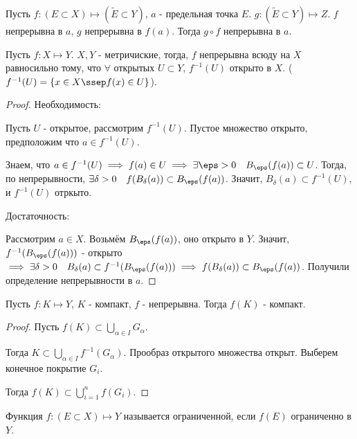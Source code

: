 \begin{theorem} \thmslashn

    Пусть $f : (E \subset X) \mapsto (\tilde{E} \subset Y)$, $a$ - предельная точка $E$. $g : \left( \tilde{E} \subset Y \right) \mapsto Z$. $f$ непрерывна в $a$, $g$ непрерывна в $f(a)$. Тогда $g \circ f$ непрерывна в $a$.
\end{theorem}
\begin{theorem} \thmslashn

    Пусть $f : X \mapsto Y$. $X, Y$ - метричиские, тогда, $f$ непрерывна всюду на $X$ равносильно тому, что $\forall$ открытых $U \subset Y$, $f^{-1}(U)$ открыто в $X$. ($f^{-1}(U) = \{x\in X\ssep f(x)\in U\} $).
    \begin{proof}
        Необходимость:

        Пусть $U$ - открытое, рассмотрим $f^{-1}(U)$. Пустое множество открыто, предположим что $a\in f^{-1}(U)$.

        Знаем, что $a\in f^{-1}(U) \implies f(a)\in U \implies \exists{\eps > 0}\quad B_{\eps}(f(a)) \subset U$. Тогда, по непрерывности, $\exists{\delta > 0}\quad f(B_{\delta}(a)) \subset B_{\eps}(f(a))$. Значит, $B_{\delta}(a) \subset f^{-1}(U)$, и $f^{-1}(U)$ отркыто.

        Достаточность:

        Рассмотрим $a\in X$. Возьмём $B_{\eps}(f(a))$, оно открыто в $Y$. Значит, $f^{-1}(B_{\eps}(f(a)))$ - открыто $\implies \exists{\delta > 0}\quad B_{\delta}(a) \subset f^{-1}(B_{\eps}(f(a))) \implies f(B_{\delta}(a)) \subset B_{\eps}(f(a))$. Получили определение непрерывности в $a$.
    \end{proof}
\end{theorem}
\begin{theorem} \thmslashn

    Пусть $f : K \mapsto Y$, $K$ - компакт, $f$ - непрерывна. Тогда $f(K)$ - компакт.
    \begin{proof} \thmslashn
        
        Пусть $f(K) \subset \bigcup_{\alpha\in I} G_{\alpha}$.

        Тогда $K \subset \bigcup_{\alpha\in I} f^{-1}(G_{\alpha})$. Прообраз открытого множества открыт. Выберем конечное покрытие $G_{i}$.

        Тогда $f(K) \subset \bigcup_{i=1}^{n} f(G_{i})$.
    \end{proof}
\end{theorem}
\begin{definition} \thmslashn 

    Функция $f : (E \subset X) \mapsto Y$ называется ограниченной, если $f(E)$ ограниченно в $Y$.
\end{definition}
